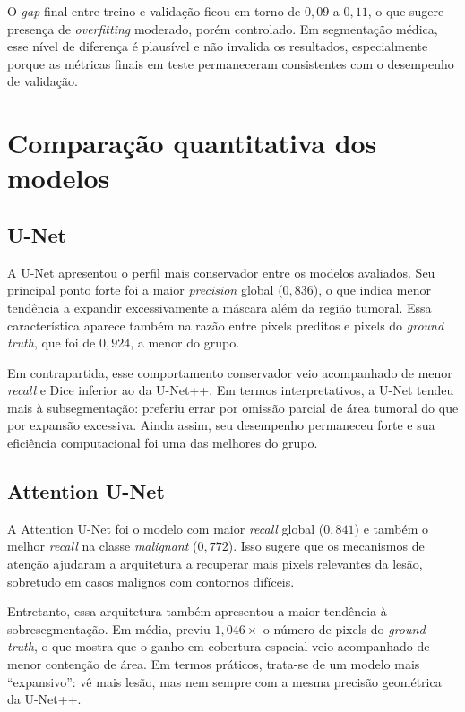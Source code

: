 \documentclass[tcc,capa]{texufpel}
\begin{document}
O \textit{gap} final entre treino e validação ficou em torno de \(0{,}09\) a \(0{,}11\), o que sugere presença de \textit{overfitting} moderado, porém controlado. Em segmentação médica, esse nível de diferença é plausível e não invalida os resultados, especialmente porque as métricas finais em teste permaneceram consistentes com o desempenho de validação.

\section{Comparação quantitativa dos modelos}

\subsection{U-Net}

A U-Net apresentou o perfil mais conservador entre os modelos avaliados. Seu principal ponto forte foi a maior \textit{precision} global (\(0{,}836\)), o que indica menor tendência a expandir excessivamente a máscara além da região tumoral. Essa característica aparece também na razão entre pixels preditos e pixels do \textit{ground truth}, que foi de \(0{,}924\), a menor do grupo.

Em contrapartida, esse comportamento conservador veio acompanhado de menor \textit{recall} e Dice inferior ao da U-Net++. Em termos interpretativos, a U-Net tendeu mais à subsegmentação: preferiu errar por omissão parcial de área tumoral do que por expansão excessiva. Ainda assim, seu desempenho permaneceu forte e sua eficiência computacional foi uma das melhores do grupo.

\subsection{Attention U-Net}

A Attention U-Net foi o modelo com maior \textit{recall} global (\(0{,}841\)) e também o melhor \textit{recall} na classe \textit{malignant} (\(0{,}772\)). Isso sugere que os mecanismos de atenção ajudaram a arquitetura a recuperar mais pixels relevantes da lesão, sobretudo em casos malignos com contornos difíceis.

Entretanto, essa arquitetura também apresentou a maior tendência à sobresegmentação. Em média, previu \(1{,}046\times\) o número de pixels do \textit{ground truth}, o que mostra que o ganho em cobertura espacial veio acompanhado de menor contenção de área. Em termos práticos, trata-se de um modelo mais “expansivo”: vê mais lesão, mas nem sempre com a mesma precisão geométrica da U-Net++.
\end{document}
